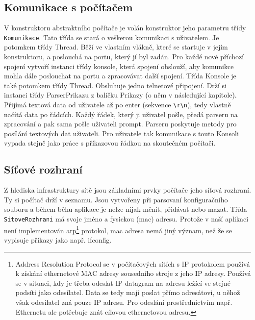 \subsection{Komunikace s počítačem}

V konstruktoru abstraktního počítače je volán konstruktor jeho parametru třídy \verb|Komunikace|. Tato třída se stará o veškerou komunikaci s uživatelem. Je potomkem třídy Thread. Běží ve vlastním vlákně, které se startuje v jejím konstruktoru, a poslouchá na portu, který jí byl zadán. Pro každé nové příchozí spojení vytvoří instanci třídy konsole, která spojení obslouží, aby komunikce mohla dále poslouchat na portu a zpracovávat další spojení. Třída Konsole je také potomkem třídy Thread. Obsluhuje jedno telnetové připojení. Drží si instanci třídy ParserPrikazu z balíčku Prikazy (o něm v následující kapitole). Přijímá textová data od uživatele až po enter (sekvence \verb|\r\n|), tedy vlastně načítá data po řádcích. Každý řádek, který ji uživatel pošle, předá parseru na zpracování a pak sama pošle uživateli prompt. Parseru poskytuje metody pro posílání textových dat uživateli. Pro uživatele tak komunikace s touto Konsoli vypada stejně jako práce s příkazovou řádkou na skoutečném počítači.


\subsection{Síťové rozhraní}

Z hlediska infrastruktury sítě jsou základními prvky počítače jeho síťová rozhraní. Ty si počítač drží v seznamu. Jsou vytvořeny při parsovaní konfiguračního souboru a během běhu aplikace je nelze nijak měnit, přidávat nebo mazat. Třída \verb|SitoveRozhrani| má svoje jméno a fysickou (mac) adresu. Protože v naší aplikaci není implementován arp\footnote{Address Resolution Protocol se v počítačových sítích s IP protokolem používá k získání ethernetové MAC adresy sousedního stroje z jeho IP adresy. Používá se v situaci, kdy je třeba odeslat IP datagram na adresu ležící ve stejné podsíti jako odesilatel. Data se tedy mají poslat přímo adresátovi, u něhož však odesilatel zná pouze IP adresu. Pro odeslání prostřednictvím např. Ethernetu ale potřebuje znát cílovou ethernetovou adresu.\cite{wiki:arp}} protokol, mac adresa nemá jiný význam, než že se vypisuje příkazy jako např. ifconfig.

